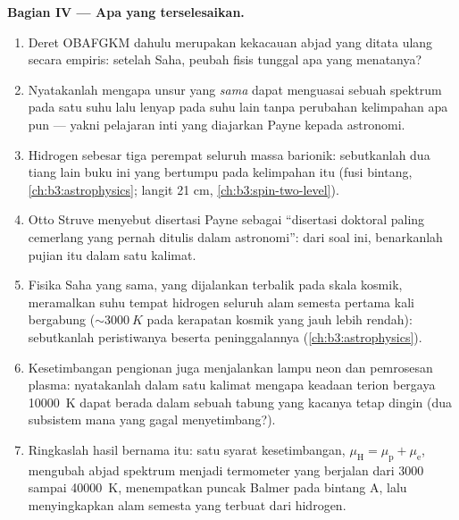 \begin{problem}
\medskip\noindent\textbf{Bagian IV --- Apa yang terselesaikan.}
\begin{enumerate}[resume]
  \item Deret OBAFGKM dahulu merupakan kekacauan abjad yang ditata ulang
        secara empiris: setelah Saha, peubah fisis tunggal apa yang
        menatanya?
  \item Nyatakanlah mengapa unsur yang \emph{sama} dapat menguasai
        sebuah spektrum pada satu suhu lalu lenyap pada suhu lain tanpa
        perubahan kelimpahan apa pun --- yakni pelajaran inti yang
        diajarkan Payne kepada astronomi.
  \item Hidrogen sebesar tiga perempat seluruh massa barionik:
        sebutkanlah dua tiang lain buku ini yang bertumpu pada
        kelimpahan itu (fusi bintang, \cref{ch:b3:astrophysics}; langit
        21 cm, \cref{ch:b3:spin-two-level}).
  \item Otto Struve menyebut disertasi Payne sebagai ``disertasi doktoral
        paling cemerlang yang pernah ditulis dalam astronomi'': dari soal ini,
        benarkanlah pujian itu dalam satu kalimat.
  \item Fisika Saha yang sama, yang dijalankan terbalik pada skala
        kosmik, meramalkan suhu tempat hidrogen seluruh alam semesta
        pertama kali bergabung ($\sim\qty{3000}{K}$ pada kerapatan
        kosmik yang jauh lebih rendah): sebutkanlah peristiwanya beserta
        peninggalannya (\cref{ch:b3:astrophysics}).
  \item Kesetimbangan pengionan juga menjalankan lampu neon dan
        pemrosesan plasma: nyatakanlah dalam satu kalimat mengapa
        keadaan terion bergaya \qty{10000}{K} dapat berada dalam sebuah
        tabung yang kacanya tetap dingin (dua subsistem mana yang gagal
        menyetimbang?).
  \item Ringkaslah hasil bernama itu: satu syarat kesetimbangan,
        $\mu_{\text{H}} = \mu_{\text{p}} + \mu_{\text{e}}$, mengubah
        abjad spektrum menjadi termometer yang berjalan dari
        $3000$ sampai \qty{40000}{K}, menempatkan puncak Balmer pada
        bintang A, lalu menyingkapkan alam semesta yang terbuat dari
        hidrogen.
\end{enumerate}
\end{problem}
